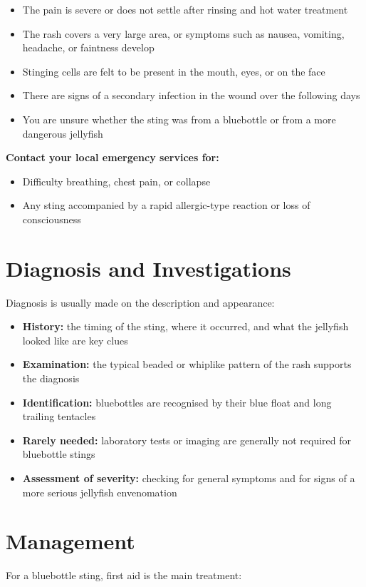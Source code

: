 \begin{itemize}
    \item The pain is severe or does not settle after rinsing and hot water treatment
    \item The rash covers a very large area, or symptoms such as nausea, vomiting, headache, or faintness develop
    \item Stinging cells are felt to be present in the mouth, eyes, or on the face
    \item There are signs of a secondary infection in the wound over the following days
    \item You are unsure whether the sting was from a bluebottle or from a more dangerous jellyfish
\end{itemize}

\textbf{Contact your local emergency services for:}
\begin{itemize}
    \item Difficulty breathing, chest pain, or collapse
    \item Any sting accompanied by a rapid allergic-type reaction or loss of consciousness
\end{itemize}

\section*{Diagnosis and Investigations}
Diagnosis is usually made on the description and appearance:

\begin{itemize}
    \item \textbf{History:} the timing of the sting, where it occurred, and what the jellyfish looked like are key clues
    \item \textbf{Examination:} the typical beaded or whiplike pattern of the rash supports the diagnosis
    \item \textbf{Identification:} bluebottles are recognised by their blue float and long trailing tentacles
    \item \textbf{Rarely needed:} laboratory tests or imaging are generally not required for bluebottle stings
    \item \textbf{Assessment of severity:} checking for general symptoms and for signs of a more serious jellyfish envenomation
\end{itemize}

\section*{Management}
For a bluebottle sting, first aid is the main treatment:

